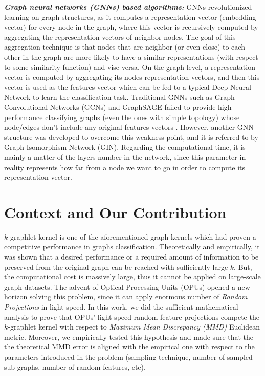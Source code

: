 \textbf{\emph{Graph neural networks (GNNs) based algorithms:}} GNNs revolutionized learning on graph structures, as it computes a representation vector (embedding vector) for every node in the graph, where this vector is recursively computed by aggregating the representation vectors of neighbor nodes. The goal of this aggregation technique is that nodes that are neighbor (or even close) to each other in the graph are more likely to have a similar representations (with respect to some similarity function) and vise versa. On the graph level, a representation vector is computed by aggregating its nodes representation vectors, and then this vector is used as the features vector which can be fed to a typical Deep Neural Network to learn the classification task. Traditional GNNs such as Graph Convolutional Networks (GCNs) and GraphSAGE failed to provide high performance classifying graphs (even the ones with simple topology) whose node/edges don't include any original features vectors \citep{GCN_powerful}. 
However, another GNN structure was developed to overcome this weakness point, and it is referred to by Graph Isomorphism Network (GIN). Regarding the computational time, it is mainly a matter of the layers number in the network, since this parameter in reality represents how far from a node we want to go in order to compute its representation vector. 

\section{Context and Our Contribution}
$k$-graphlet kernel is one of the aforementioned graph kernels which had proven a competitive performance in graphs classification. Theoretically and empirically, it was shown that a desired performance or a required amount of information to be preserved from the original graph can be reached with sufficiently large $k$. But,  the computational cost is massively large, thus it cannot be applied on large-scale graph datasets. The advent of Optical Processing Units (OPUs) opened a new horizon solving this problem, since it can apply enormous number of \emph{Random Projections} in light speed. \newline
In this work, we did the sufficient mathematical analysis to prove that OPUs' light-speed random feature projections compete the $k$-graphlet kernel with respect to \emph{Maximum Mean Discrepancy (MMD)} Euclidean metric. Moreover, we empirically tested this hypothesis and made sure that the the theoretical MMD error is aligned with the empirical one with respect to the parameters introduced in the problem (sampling technique, number of sampled sub-graphs, number of random features, etc). 






